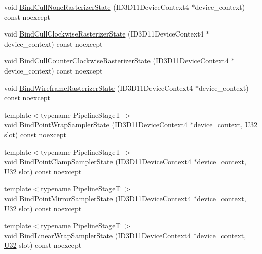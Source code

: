 \begin{DoxyCompactItemize}
\item 
void \hyperlink{classmage_1_1_rendering_state_manager_a9dfef6d7fb2cea65fc362e4768088ed0}{Bind\+Cull\+None\+Rasterizer\+State} (I\+D3\+D11\+Device\+Context4 $\ast$device\+\_\+context) const noexcept
\item 
void \hyperlink{classmage_1_1_rendering_state_manager_a02d762d33aa2aff3ebdbe69ec6f35787}{Bind\+Cull\+Clockwise\+Rasterizer\+State} (I\+D3\+D11\+Device\+Context4 $\ast$device\+\_\+context) const noexcept
\item 
void \hyperlink{classmage_1_1_rendering_state_manager_a54d2bc53eaeb2ac0a01a2b9e26890f77}{Bind\+Cull\+Counter\+Clockwise\+Rasterizer\+State} (I\+D3\+D11\+Device\+Context4 $\ast$device\+\_\+context) const noexcept
\item 
void \hyperlink{classmage_1_1_rendering_state_manager_a1e199563076b4596bfaa0bac22a86848}{Bind\+Wireframe\+Rasterizer\+State} (I\+D3\+D11\+Device\+Context4 $\ast$device\+\_\+context) const noexcept
\item 
{\footnotesize template$<$typename Pipeline\+StageT $>$ }\\void \hyperlink{classmage_1_1_rendering_state_manager_aa0ad7b628aa8d93b5de8bd398ac8e52a}{Bind\+Point\+Wrap\+Sampler\+State} (I\+D3\+D11\+Device\+Context4 $\ast$device\+\_\+context, \hyperlink{namespacemage_a41c104c036fba3756a74e19f793eeaa1}{U32} slot) const noexcept
\item 
{\footnotesize template$<$typename Pipeline\+StageT $>$ }\\void \hyperlink{classmage_1_1_rendering_state_manager_a704a0131b99623a7a2b9d032891c0e25}{Bind\+Point\+Clamp\+Sampler\+State} (I\+D3\+D11\+Device\+Context4 $\ast$device\+\_\+context, \hyperlink{namespacemage_a41c104c036fba3756a74e19f793eeaa1}{U32} slot) const noexcept
\item 
{\footnotesize template$<$typename Pipeline\+StageT $>$ }\\void \hyperlink{classmage_1_1_rendering_state_manager_a98258c392a171347ed75efcf6ab7da58}{Bind\+Point\+Mirror\+Sampler\+State} (I\+D3\+D11\+Device\+Context4 $\ast$device\+\_\+context, \hyperlink{namespacemage_a41c104c036fba3756a74e19f793eeaa1}{U32} slot) const noexcept
\item 
{\footnotesize template$<$typename Pipeline\+StageT $>$ }\\void \hyperlink{classmage_1_1_rendering_state_manager_a75657c95338941b359683ba9dee58aa3}{Bind\+Linear\+Wrap\+Sampler\+State} (I\+D3\+D11\+Device\+Context4 $\ast$device\+\_\+context, \hyperlink{namespacemage_a41c104c036fba3756a74e19f793eeaa1}{U32} slot) const noexcept

\end{DoxyCompactItemize}
